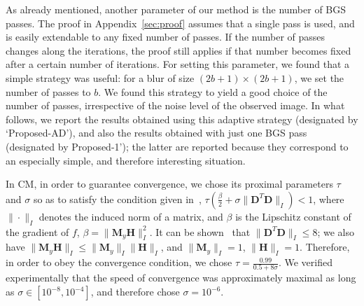 \documentclass[10pt,twocolumn,twoside]{IEEEtran}
\newcommand{\Hm}{\mathbf{H}} %
\newcommand{\D}{\mathbf{D}} %
\newcommand{\M}{\mathbf{M}} %
\begin{document}
As already mentioned, another parameter of our method is the number of BGS passes. The proof in Appendix~\ref{sec:proof} assumes that a single pass is used, and is easily extendable to any fixed number of passes. If the number of passes changes along the iterations, the proof still applies if that number becomes fixed after a certain number of iterations. For setting this parameter, we found that a simple strategy was useful: for a blur of size $(2b+1)\times(2b+1)$, we set the number of passes to $b$. We found this strategy to yield a good choice of the number of passes, irrespective of the noise level of the observed image. In what follows, we report the results obtained using this adaptive strategy (designated by `Proposed-AD'), and also the results obtained with just one BGS pass (designated by Proposed-1'); the latter are reported because they correspond to an especially simple, and therefore interesting situation.

In CM, in order to guarantee convergence, we chose its proximal parameters $\tau$ and $\sigma$ so as to satisfy the condition given in~\cite{Condat2014}, $\tau( \frac{\beta}{2} + \sigma \| \D^T \D \|_I ) < 1$, where $\| \cdot \|_I$ denotes the induced norm of a matrix, and $\beta$ is the Lipschitz constant of the gradient of $f$, $\beta = \| \M_y \Hm\|_I^2$. It can be shown~\cite{Chambolle2004} that $\| \D^T \D \|_I \leq 8$; we also have $\| \M_y \Hm\|_I \leq \| \M_y \|_I \| \Hm\|_I$, and $\| \M_y \|_I = 1$, $\| \Hm \|_I = 1$.  Therefore, in order to obey the convergence condition, we chose $\tau = \frac{0.99}{0.5+8 \sigma}$. We verified experimentally that the speed of convergence was approximately maximal as long as $\sigma \in [10^{-8}, 10^{-4}]$, and therefore chose $\sigma = 10^{-6}$.
\end{document}
